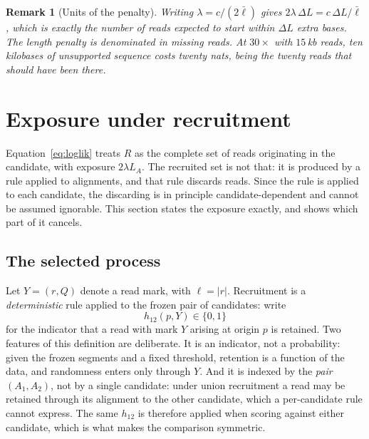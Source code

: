 \documentclass[11pt]{article}
\newtheorem{remark}{Remark}
\begin{document}
\begin{remark}[Units of the penalty]
Writing $\lambda = c/(2\bar\ell)$ gives
$2\lambda\,\Delta L = c\,\Delta L/\bar\ell$, which is exactly the number of
reads expected to start within $\Delta L$ extra bases.  The length penalty is
denominated in \emph{missing reads}.  At $30\times$ with $15$\,kb reads, ten
kilobases of unsupported sequence costs twenty nats, being the twenty reads that
should have been there.
\end{remark}

\section{Exposure under recruitment}
\label{sec:exposure}

Equation~\eqref{eq:loglik} treats $R$ as the complete set of reads originating
in the candidate, with exposure $2\lambda L_A$.  The recruited set is not that:
it is produced by a rule applied to alignments, and that rule discards reads.
Since the rule is applied to each candidate, the discarding is in principle
candidate-dependent and cannot be assumed ignorable.  This section states the
exposure exactly, and shows which part of it cancels.

\subsection{The selected process}

Let $Y = (r,Q)$ denote a read mark, with $\ell = |r|$.  Recruitment is a
\emph{deterministic} rule applied to the frozen pair of candidates: write
\begin{equation}
    h_{12}(p,Y) \in \{0,1\}
\end{equation}
for the indicator that a read with mark $Y$ arising at origin $p$ is retained.
Two features of this definition are deliberate.  It is an indicator, not a
probability: given the frozen segments and a fixed threshold, retention is a
function of the data, and randomness enters only through $Y$.  And it is
indexed by the \emph{pair} $(A_1,A_2)$, not by a single candidate: under union
recruitment a read may be retained through its alignment to the other
candidate, which a per-candidate rule cannot express.  The same $h_{12}$ is
therefore applied when scoring against either candidate, which is what makes
the comparison symmetric.
\end{document}
